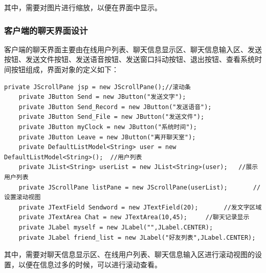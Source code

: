 \documentclass[UTF8,12pt]{article}
\begin{document}
其中，需要对图片进行缩放，以便在界面中显示。

\subsubsection{客户端的聊天界面设计}
客户端的聊天界面主要由在线用户列表、聊天信息显示区、聊天信息输入区、发送按钮、发送文件按钮、发送语音按钮、发送窗口抖动按钮、退出按钮、查看系统时间按钮组成，界面对象的定义如下：

\begin{lstlisting}[title=聊天界面对象的定义,frame=shadowbox]
    private JScrollPane jsp = new JScrollPane();//滚动条
    private JButton Send = new JButton("发送文字");
    private JButton Send_Record = new JButton("发送语音");
    private JButton Send_File = new JButton("发送文件");
    private JButton myClock = new JButton("系统时间");
    private JButton Leave = new JButton("离开聊天室");
    private DefaultListModel<String> user = new DefaultListModel<String>();  //用户列表
    private JList<String> userList = new JList<String>(user);   //展示用户列表
    private JScrollPane listPane = new JScrollPane(userList);       //设置滚动视图
    private JTextField Sendword = new JTextField(20);       //发文字区域
    private JTextArea Chat = new JTextArea(10,45);     //聊天记录显示
    private JLabel myself = new JLabel("",JLabel.CENTER);
    private JLabel friend_list = new JLabel("好友列表",JLabel.CENTER);
\end{lstlisting}

其中，需要对聊天信息显示区、在线用户列表、聊天信息输入区进行滚动视图的设置，以便在信息过多的时候，可以进行滚动查看。
\end{document}
